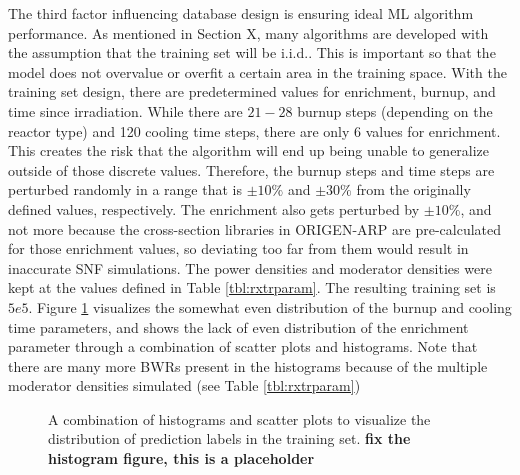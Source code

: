 The third factor influencing database
design is ensuring ideal \gls{ML} algorithm performance.  As mentioned in
Section X, many algorithms are developed with the assumption that the training
set will be \acrfull{i.i.d.}.  This is important so that the model does not
overvalue or overfit a certain area in the training space. With the training
set design, there are predetermined values for enrichment, burnup, and time
since irradiation.  While there are $21-28$ burnup steps (depending on the
reactor type) and 120 cooling time steps, there are only 6 values for
enrichment. This creates the risk that the algorithm will end up being unable
to generalize outside of those discrete values. Therefore, the burnup steps and
time steps are perturbed randomly in a range that is $\pm10\%$ and $\pm30\%$
from the originally defined values, respectively.  The enrichment also gets
perturbed by $\pm10\%$, and not more because the cross-section libraries in
\gls{ORIGEN-ARP} are pre-calculated for those enrichment values, so deviating
too far from them would result in inaccurate \gls{SNF} simulations. The power
densities and moderator densities were kept at the values defined in Table
\ref{tbl:rxtrparam}.  The resulting training set is $5e5$.  Figure
\ref{fig:trainhist} visualizes the somewhat even distribution of the burnup and
cooling time parameters, and shows the lack of even distribution of the
enrichment parameter through a combination of scatter plots and histograms.
Note that there are many more \gls{BWR}s present in the histograms because of
the multiple moderator densities simulated (see Table \ref{tbl:rxtrparam})

\begin{figure}[!htb]
  \caption{A combination of histograms and scatter plots to visualize the 
           distribution of prediction labels in the training set.
           \textbf{\Large fix the histogram figure, this is a placeholder}}
  \label{fig:trainhist}
\end{figure}

